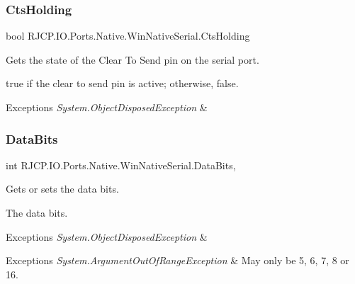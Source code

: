 \subsubsection{\texorpdfstring{CtsHolding}{CtsHolding}}
{\footnotesize\ttfamily bool R\+J\+C\+P.\+I\+O.\+Ports.\+Native.\+Win\+Native\+Serial.\+Cts\+Holding\hspace{0.3cm}{\ttfamily [get]}}



Gets the state of the Clear To Send pin on the serial port. 

{\ttfamily true} if the clear to send pin is active; otherwise, {\ttfamily false}. 


\begin{DoxyExceptions}{Exceptions}
{\em System.\+Object\+Disposed\+Exception} & \\
\hline
\end{DoxyExceptions}
\mbox{\label{class_r_j_c_p_1_1_i_o_1_1_ports_1_1_native_1_1_win_native_serial_ac931f68d7ac798d373d43012c070da7e}} 
\subsubsection{\texorpdfstring{DataBits}{DataBits}}
{\footnotesize\ttfamily int R\+J\+C\+P.\+I\+O.\+Ports.\+Native.\+Win\+Native\+Serial.\+Data\+Bits\hspace{0.3cm}{\ttfamily [get]}, {\ttfamily [set]}}



Gets or sets the data bits. 

The data bits. 


\begin{DoxyExceptions}{Exceptions}
{\em System.\+Object\+Disposed\+Exception} & 
\begin{DoxyExceptions}{Exceptions}
{\em System.\+Argument\+Out\+Of\+Range\+Exception} & May only be 5, 6, 7, 8 or 16.\\
\hline
\end{DoxyExceptions}
\\
\hline
\end{DoxyExceptions}
\mbox{\label{class_r_j_c_p_1_1_i_o_1_1_ports_1_1_native_1_1_win_native_serial_aa48c6da74cbb78d90cbe9d4d3096a281}} 
